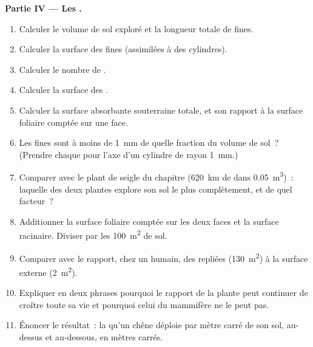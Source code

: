 \begin{problem}
\medskip
\noindent\textbf{Partie IV --- Les .}
\begin{enumerate}[resume]
  \item Calculer le volume de sol exploré et la longueur totale de
         fines.
  \item Calculer la surface des  fines (assimilées à des
        cylindres).
  \item Calculer le nombre de .
  \item Calculer la surface des .
  \item Calculer la surface absorbante souterraine totale, et son
        rapport à la surface foliaire comptée sur une face.
  \item Les  fines sont à moins de \qty{1}{mm} de quelle fraction
        du volume de sol~? (Prendre chaque  pour l'axe d'un
        cylindre de rayon \qty{1}{mm}.)
  \item Comparer avec le plant de seigle du chapitre (\qty{620}{km} de
         dans \qty{0.05}{m^3})~: laquelle des deux plantes
        explore son sol le plus complètement, et de quel facteur~?
  \item Additionner la surface foliaire comptée sur les deux faces et la
        surface racinaire. Diviser par les \qty{100}{m^2} de sol.
  \item Comparer avec le rapport, chez un humain, des  repliées (\qty{130}{m^2}) à la surface externe
        (\qty{2}{m^2}).
  \item Expliquer en deux phrases pourquoi le rapport de la plante peut
        continuer de croître toute sa vie et pourquoi celui du
        mammifère ne le peut pas.
  \item Énoncer le résultat~: la  qu'un chêne déploie
        par mètre carré de son sol, au-dessus et au-dessous, en mètres
        carrés.
\end{enumerate}
\end{problem}

